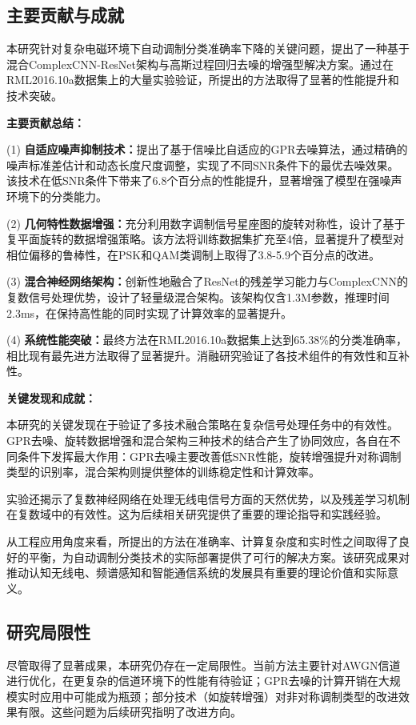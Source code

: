\documentclass[conference]{IEEEtran}
\begin{document}
\subsection{主要贡献与成就}

本研究针对复杂电磁环境下自动调制分类准确率下降的关键问题，提出了一种基于混合ComplexCNN-ResNet架构与高斯过程回归去噪的增强型解决方案。通过在RML2016.10a数据集上的大量实验验证，所提出的方法取得了显著的性能提升和技术突破。

\textbf{主要贡献总结：}

(1) \textbf{自适应噪声抑制技术：}提出了基于信噪比自适应的GPR去噪算法，通过精确的噪声标准差估计和动态长度尺度调整，实现了不同SNR条件下的最优去噪效果。该技术在低SNR条件下带来了6.8个百分点的性能提升，显著增强了模型在强噪声环境下的分类能力。

(2) \textbf{几何特性数据增强：}充分利用数字调制信号星座图的旋转对称性，设计了基于复平面旋转的数据增强策略。该方法将训练数据集扩充至4倍，显著提升了模型对相位偏移的鲁棒性，在PSK和QAM类调制上取得了3.8-5.9个百分点的改进。

(3) \textbf{混合神经网络架构：}创新性地融合了ResNet的残差学习能力与ComplexCNN的复数信号处理优势，设计了轻量级混合架构。该架构仅含1.3M参数，推理时间2.3ms，在保持高性能的同时实现了计算效率的显著提升。

(4) \textbf{系统性能突破：}最终方法在RML2016.10a数据集上达到65.38\%的分类准确率，相比现有最先进方法取得了显著提升。消融研究验证了各技术组件的有效性和互补性。

\textbf{关键发现和成就：}

本研究的关键发现在于验证了多技术融合策略在复杂信号处理任务中的有效性。GPR去噪、旋转数据增强和混合架构三种技术的结合产生了协同效应，各自在不同条件下发挥最大作用：GPR去噪主要改善低SNR性能，旋转增强提升对称调制类型的识别率，混合架构则提供整体的训练稳定性和计算效率。

实验还揭示了复数神经网络在处理无线电信号方面的天然优势，以及残差学习机制在复数域中的有效性。这为后续相关研究提供了重要的理论指导和实践经验。

从工程应用角度来看，所提出的方法在准确率、计算复杂度和实时性之间取得了良好的平衡，为自动调制分类技术的实际部署提供了可行的解决方案。该研究成果对推动认知无线电、频谱感知和智能通信系统的发展具有重要的理论价值和实际意义。

\subsection{研究局限性}

尽管取得了显著成果，本研究仍存在一定局限性。当前方法主要针对AWGN信道进行优化，在更复杂的信道环境下的性能有待验证；GPR去噪的计算开销在大规模实时应用中可能成为瓶颈；部分技术（如旋转增强）对非对称调制类型的改进效果有限。这些问题为后续研究指明了改进方向。
\end{document}
